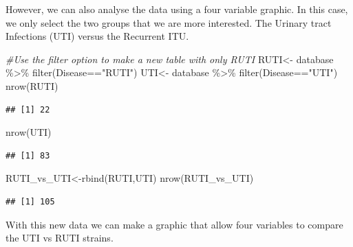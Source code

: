 \documentclass[
]{article}
\newenvironment{Shaded}{\begin{snugshade}}{\end{snugshade}}
\newcommand{\CommentTok}[1]{\textcolor[rgb]{0.56,0.35,0.01}{\textit{#1}}}
\newcommand{\FunctionTok}[1]{\textcolor[rgb]{0.00,0.00,0.00}{#1}}
\newcommand{\NormalTok}[1]{#1}
\newcommand{\OtherTok}[1]{\textcolor[rgb]{0.56,0.35,0.01}{#1}}
\newcommand{\SpecialCharTok}[1]{\textcolor[rgb]{0.00,0.00,0.00}{#1}}
\newcommand{\StringTok}[1]{\textcolor[rgb]{0.31,0.60,0.02}{#1}}
\begin{document}
However, we can also analyse the data using a four variable graphic. In
this case, we only select the two groups that we are more interested.
The Urinary tract Infections (UTI) versus the Recurrent ITU.

\begin{Shaded}
\begin{Highlighting}[]
\CommentTok{\#Use the filter option to make a new table with only RUTI }
\NormalTok{RUTI}\OtherTok{\textless{}{-}}\NormalTok{ database }\SpecialCharTok{\%\textgreater{}\%} \FunctionTok{filter}\NormalTok{(Disease}\SpecialCharTok{==}\StringTok{"RUTI"}\NormalTok{)}
\NormalTok{UTI}\OtherTok{\textless{}{-}}\NormalTok{ database }\SpecialCharTok{\%\textgreater{}\%} \FunctionTok{filter}\NormalTok{(Disease}\SpecialCharTok{==}\StringTok{"UTI"}\NormalTok{)}
\FunctionTok{nrow}\NormalTok{(RUTI)}
\end{Highlighting}
\end{Shaded}

\begin{verbatim}
## [1] 22
\end{verbatim}

\begin{Shaded}
\begin{Highlighting}[]
\FunctionTok{nrow}\NormalTok{(UTI)}
\end{Highlighting}
\end{Shaded}

\begin{verbatim}
## [1] 83
\end{verbatim}

\begin{Shaded}
\begin{Highlighting}[]
\NormalTok{RUTI\_vs\_UTI}\OtherTok{\textless{}{-}}\FunctionTok{rbind}\NormalTok{(RUTI,UTI)}
\FunctionTok{nrow}\NormalTok{(RUTI\_vs\_UTI)}
\end{Highlighting}
\end{Shaded}

\begin{verbatim}
## [1] 105
\end{verbatim}

With this new data we can make a graphic that allow four variables to
compare the UTI vs RUTI strains.
\end{document}
